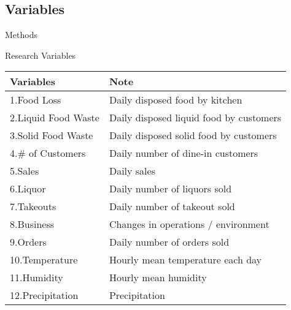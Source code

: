 \documentclass{beamer}\usepackage[]{graphicx}\usepackage[]{xcolor}
\begin{document}
\subsection{Variables}
\begin{frame}{Methods}
    \begin{block}{Research Variables}
    \small
        \begin{tabular}{ll}
            \hline
            Variables & Note \\ \hline
            1.Food Loss & Daily disposed food by kitchen \\
            2.Liquid Food Waste & Daily disposed liquid food by customers \\
            3.Solid Food Waste & Daily disposed solid food by customers \\ \hline
            4.\# of Customers & Daily number of dine-in customers \\
            5.Sales & Daily sales \\
            6.Liquor & Daily number of liquors sold \\
            7.Takeouts & Daily number of takeout sold \\
            8.Business & Changes in operations / environment\\
            \vspace{0.5em}
            9.Orders & Daily number of orders sold \\
            10.Temperature & Hourly mean temperature each day \\
            11.Humidity & Hourly mean humidity \\
            12.Precipitation & Precipitation \\ \hline
        \end{tabular}
    \end{block}
        
\end{frame}

\end{document}

